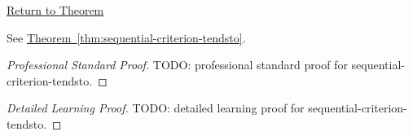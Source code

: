 \newpage
{}
\label{prf:sequential-criterion-tendsto}

\begin{remark*}[Return]
\hyperref[thm:sequential-criterion-tendsto]{Return to Theorem}
\end{remark*}

\begin{theorem*}
See \hyperref[thm:sequential-criterion-tendsto]{Theorem~\ref*{thm:sequential-criterion-tendsto}}.
\end{theorem*}

\begin{proof}[Professional Standard Proof]
\LRAProofBodyStart
TODO: professional standard proof for sequential-criterion-tendsto.
\end{proof}

\begin{proof}[Detailed Learning Proof]
\LRAProofBodyStart
TODO: detailed learning proof for sequential-criterion-tendsto.
\end{proof}

\begin{remark*}
\end{remark*}

\begin{dependencies}
\NoLocalDependencies
\end{dependencies}

\clearpage
